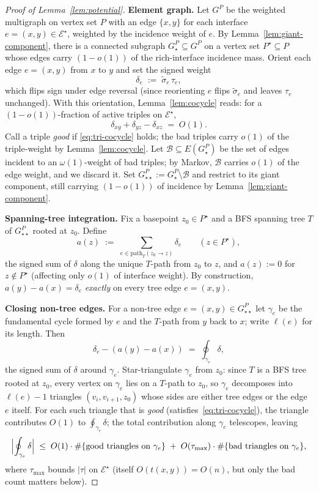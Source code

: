 \begin{proof}[Proof of Lemma~\ref{lem:potential}]
\textbf{Element graph.}
Let $G^P$ be the weighted multigraph on vertex set $P$ with an edge
$\{x,y\}$ for each interface $e=(x,y)\in\mathcal{E}^\star$, weighted
by the incidence weight of $e$.  By Lemma~\ref{lem:giant-component},
there is a connected subgraph
$G^P_\star\subseteq G^P$ on a vertex set $P^\star\subseteq P$ whose
edges carry $(1-o(1))$ of the rich-interface incidence mass.
Orient each edge $e=(x,y)$ from $x$ to $y$ and set the signed weight
\[
  \delta_e \;:=\; \widetilde\sigma_e\,\tau_e,
\]
which flips sign under edge reversal (since reorienting $e$ flips
$\widetilde\sigma_e$ and leaves $\tau_e$ unchanged).
With this orientation, Lemma~\ref{lem:cocycle} reads: for a
$(1-o(1))$-fraction of active triples on
$\mathcal{E}^\star$,
\begin{equation}\label{eq:tri-cocycle}
  \delta_{xy} + \delta_{yz} - \delta_{xz} \;=\; O(1).
\end{equation}
Call a triple \emph{good} if \eqref{eq:tri-cocycle} holds; the bad
triples carry $o(1)$ of the triple-weight by Lemma~\ref{lem:cocycle}.
Let $\mathcal{B}\subseteq E(G^P_\star)$ be the set of edges incident
to an $\omega(1)$-weight of bad triples; by Markov, $\mathcal{B}$
carries $o(1)$ of the edge weight, and we discard it.  Set
$G^P_{\star\star}:=G^P_\star\setminus\mathcal{B}$ and restrict to its
giant component, still carrying $(1-o(1))$ of incidence by
Lemma~\ref{lem:giant-component}.

\textbf{Spanning-tree integration.}
Fix a basepoint $z_0\in P^\star$ and a BFS spanning tree $T$ of
$G^P_{\star\star}$ rooted at $z_0$.  Define
\[
  a(z) \;:=\; \sum_{e\in\mathrm{path}_T(z_0\to z)}\delta_e
  \qquad (z\in P^\star),
\]
the signed sum of $\delta$ along the unique $T$-path from $z_0$ to
$z$, and $a(z):=0$ for $z\notin P^\star$ (affecting only $o(1)$ of
interface weight).
By construction,
$a(y)-a(x)=\delta_e$ \emph{exactly} on every tree edge $e=(x,y)$.

\textbf{Closing non-tree edges.}
For a non-tree edge $e=(x,y)\in G^P_{\star\star}$ let $\gamma_e$ be
the fundamental cycle formed by $e$ and the $T$-path from $y$ back
to $x$; write $\ell(e)$ for its length.  Then
\[
  \delta_e - (a(y)-a(x)) \;=\; \oint_{\gamma_e}\delta,
\]
the signed sum of $\delta$ around $\gamma_e$.
Star-triangulate $\gamma_e$ from $z_0$: since $T$ is a BFS tree
rooted at $z_0$, every vertex on $\gamma_e$ lies on a $T$-path to
$z_0$, so $\gamma_e$ decomposes into $\ell(e)-1$ triangles
$(v_i,v_{i+1},z_0)$ whose sides are either tree edges or the edge
$e$ itself.  For each such triangle that is \emph{good}
(satisfies~\eqref{eq:tri-cocycle}), the triangle contributes $O(1)$
to $\oint_{\gamma_e}\delta$; the total contribution along $\gamma_e$
telescopes, leaving
\begin{equation}\label{eq:cycle-bound}
  \Bigl|\oint_{\gamma_e}\delta\Bigr|
  \;\le\; O(1)\cdot\#\{\text{good triangles on }\gamma_e\}
  \;+\; O(\tau_{\max})\cdot\#\{\text{bad triangles on }\gamma_e\},
\end{equation}
where $\tau_{\max}$ bounds $|\tau|$ on $\mathcal{E}^\star$ (itself
$O(t(x,y))=O(n)$, but only the bad count matters below).


\end{proof}
